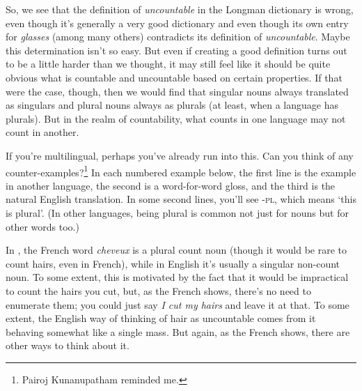 So, we see that the definition of \textit{uncountable} in the Longman dictionary is wrong, even though it's generally a very good dictionary and even though its own entry for \textit{glasses} (among many others) contradicts its definition of \textit{uncountable}. Maybe this determination isn't so easy. But even if creating a good definition turns out to be a little harder than we thought, it may still feel like it should be quite obvious what is countable and uncountable based on certain properties. If that were the case, though, then we would find that singular nouns always translated as singulars and plural nouns always as plurals (at least, when a language has plurals). But in the realm of countability, what counts in one language may not count in another.

If you're multilingual, perhaps you've already run into this. Can you think of any counter-examples?\footnote{Pairoj Kunanupatham reminded me.}
In each numbered example below, the first line is the example in another language, the second is a word-for-word gloss, and the third is the natural English translation. In some second lines, you'll see -\textsc{pl}, which means `this is plural'. (In other languages, being plural is common not just for nouns but for other words too.)

\ea
{}\label{ex:cheveaux}
\label{ex:Картошка}
\label{ex:khobor}
\label{ex:pease}
\z
\z
{}In , the French word \textit{cheveux} is a plural count noun  (though it would be rare to count hairs, even in French), while in English it's usually a singular non-count noun. To some extent, this is motivated by the fact that it would be impractical to count the hairs you cut, but, as the French shows, there's no need to enumerate them; you could just say \textit{I cut my hairs} and leave it at that. To some extent, the English way of thinking of hair as uncountable comes from it behaving somewhat like a single mass. But again, as the French shows, there are other ways to think about it.

